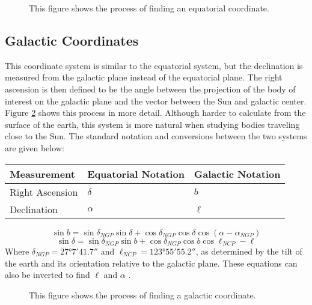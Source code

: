 \documentclass[12pt,twoside]{reedthesis}
\begin{document}
\begin{figure}[p]
    \caption{This figure shows the process of finding an equatorial coordinate.}
    \label{equatorial-coords}
\end{figure}

\subsection*{Galactic Coordinates}

This coordinate system is similar to the equatorial system, but the declination is measured from the galactic plane instead of the equatorial plane. The right ascension is then defined to be the angle between the projection of the body of interest on the galactic plane and the vector between the Sun and galactic center. Figure \ref{galactic-coords} shows this process in more detail. Although harder to calculate from the surface of the earth, this system is more natural when studying bodies traveling close to the Sun. The standard notation and conversions between the two systems are given below:

\begin{tabular}{lll} \toprule
    Measurement & Equatorial Notation & Galactic Notation \\ \midrule
    Right Ascension &  $\delta$       & $b$               \\
    Declination     &  $\alpha$       & $\ell$            \\ \bottomrule
\end{tabular}

\begin{equation}
    \sin b = \sin \delta_{NGP} \sin \delta + \cos \delta_{NGP} \cos \delta \cos (\alpha-\alpha_{NGP})
\end{equation}
\begin{equation}
    \sin \delta = \sin \delta_{NGP} \sin b + \cos \delta_{NGP} \cos b \cos{\ell_{NCP} - \ell}
\end{equation}
Where $\delta_{NGP} = \ang{27;7;41.7}$ and $\ell_{NCP}=\ang{123;55;55.2}$, as determined by the tilt of the earth and its orientation relative to the galactic plane. These equations can also be inverted to find $\ell$ and $\alpha$ \citep[pp. 900]{modern-astrophysics}.

\begin{figure}[p]
    \caption{This figure shows the process of finding a galactic coordinate.}
    \label{galactic-coords}
\end{figure}
\end{document}
